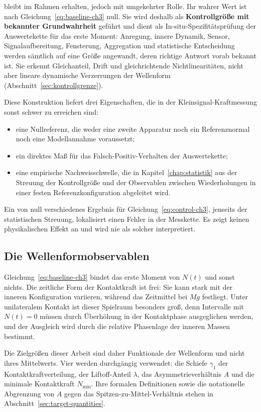 \documentclass[12pt,a4paper]{report}
\begin{document}
bleibt im Rahmen erhalten, jedoch mit umgekehrter Rolle. Ihr wahrer Wert
ist nach Gleichung~\eqref{eq:baseline-ch3} null. Sie wird deshalb als
\textbf{Kontrollgröße mit bekannter Grundwahrheit} geführt und dient als
In-situ-Spezifitätsprüfung der Auswertekette für das erste Moment:
Anregung, innere Dynamik, Sensor, Signalaufbereitung, Fensterung,
Aggregation und statistische Entscheidung werden sämtlich auf eine Größe
angewandt, deren richtige Antwort vorab bekannt ist. Sie erkennt
Gleichanteil, Drift und gleichrichtende Nichtlinearitäten, nicht aber
lineare dynamische Verzerrungen der Wellenform
(Abschnitt~\ref{sec:kontrollgrenze}).

Diese Konstruktion liefert drei Eigenschaften, die in der
Kleinsignal-Kraftmessung sonst schwer zu erreichen sind:

\begin{itemize}
  \item eine Nullreferenz, die weder eine zweite Apparatur noch ein
        Referenznormal noch eine Modellannahme voraussetzt;
  \item ein direktes Maß für das Falsch-Positiv-Verhalten der
        Auswertekette;
  \item eine empirische Nachweisschwelle, die in Kapitel~\ref{chap:statistik} aus der
        Streuung der Kontrollgröße und der Observablen zwischen
        Wiederholungen in einer festen Referenzkonfiguration abgeleitet
        wird.
\end{itemize}

Ein von null verschiedenes Ergebnis für
Gleichung~\eqref{eq:control-ch3}, jenseits der statistischen Streuung,
lokalisiert einen Fehler in der Messkette. Es zeigt keinen
physikalischen Effekt an und wird nie als solcher interpretiert.

\subsection{Die Wellenformobservablen}

Gleichung~\eqref{eq:baseline-ch3} bindet das erste Moment von $N(t)$ und
sonst nichts. Die zeitliche Form der Kontaktkraft ist frei: Sie kann
stark mit der inneren Konfiguration variieren, während das Zeitmittel bei
$Mg$ festliegt. Unter unilateralem Kontakt ist dieser Spielraum besonders
groß, denn Intervalle mit $N(t) = 0$ müssen durch Überhöhung in der
Kontaktphase ausgeglichen werden, und der Ausgleich wird durch die
relative Phasenlage der inneren Massen bestimmt.

Die Zielgrößen dieser Arbeit sind daher Funktionale der Wellenform und
nicht ihres Mittelwerts. Vier werden durchgängig verwendet: die Schiefe
$\gamma_1$ der Kontaktkraftverteilung, der Liftoff-Anteil $\lambda$, das
Asymmetrieverhältnis $A$ und die minimale Kontaktkraft $N_{\min}$. Ihre
formalen Definitionen sowie die notationelle Abgrenzung von $A$ gegen das
Spitzen-zu-Mittel-Verhältnis stehen in
Abschnitt~\ref{sec:target-quantities}.
\end{document}
